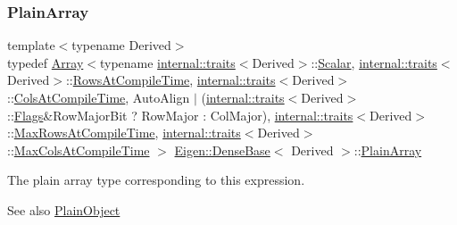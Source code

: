 \subsubsection{\texorpdfstring{PlainArray}{PlainArray}}
{\footnotesize\ttfamily template$<$typename Derived$>$ \\
typedef \mbox{\hyperlink{class_eigen_1_1_array}{Array}}$<$typename \mbox{\hyperlink{struct_eigen_1_1internal_1_1traits}{internal\+::traits}}$<$Derived$>$\+::\mbox{\hyperlink{class_eigen_1_1_dense_base_a5feed465b3a8e60c47e73ecce83e39a2}{Scalar}}, \mbox{\hyperlink{struct_eigen_1_1internal_1_1traits}{internal\+::traits}}$<$Derived$>$\+::\mbox{\hyperlink{class_eigen_1_1_dense_base_a86241c772c74c04eeeb0480b99c5ab77adb37c78ebbf15aa20b65c3b70415a1ab}{Rows\+At\+Compile\+Time}}, \mbox{\hyperlink{struct_eigen_1_1internal_1_1traits}{internal\+::traits}}$<$Derived$>$\+::\mbox{\hyperlink{class_eigen_1_1_dense_base_a86241c772c74c04eeeb0480b99c5ab77a787f85fd67ee5985917eb2cef6e70441}{Cols\+At\+Compile\+Time}}, Auto\+Align $\vert$ (\mbox{\hyperlink{struct_eigen_1_1internal_1_1traits}{internal\+::traits}}$<$Derived$>$\+::\mbox{\hyperlink{class_eigen_1_1_dense_base_a86241c772c74c04eeeb0480b99c5ab77a7392c9b2ad41ba3c16fdc5306c04d581}{Flags}}\&Row\+Major\+Bit ? Row\+Major \+: Col\+Major), \mbox{\hyperlink{struct_eigen_1_1internal_1_1traits}{internal\+::traits}}$<$Derived$>$\+::\mbox{\hyperlink{class_eigen_1_1_dense_base_a86241c772c74c04eeeb0480b99c5ab77ad2baadea085372837b0e80dc93be1306}{Max\+Rows\+At\+Compile\+Time}}, \mbox{\hyperlink{struct_eigen_1_1internal_1_1traits}{internal\+::traits}}$<$Derived$>$\+::\mbox{\hyperlink{class_eigen_1_1_dense_base_a86241c772c74c04eeeb0480b99c5ab77acc3a41000cf1d29dd1a320b2a09d2a65}{Max\+Cols\+At\+Compile\+Time}} $>$ \mbox{\hyperlink{class_eigen_1_1_dense_base}{Eigen\+::\+Dense\+Base}}$<$ Derived $>$\+::\mbox{\hyperlink{class_eigen_1_1_dense_base_a65328b7d6fc10a26ff6cd5801a6a44eb}{Plain\+Array}}}

The plain array type corresponding to this expression. \begin{DoxySeeAlso}{See also}
\mbox{\hyperlink{class_eigen_1_1_dense_base_aae45af9b5aca5a9caae98fd201f47cc4}{Plain\+Object}} 
\end{DoxySeeAlso}
\mbox{\label{class_eigen_1_1_dense_base_aa301ef39d63443e9ef0b84f47350116e}} 
